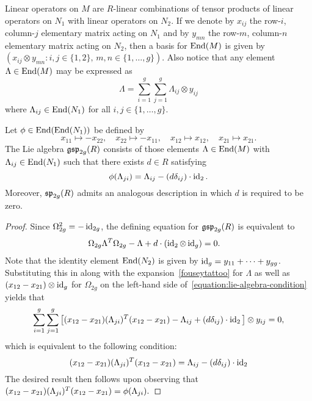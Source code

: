 Linear operators on $M$ are $R$-linear combinations of tensor products of linear operators on $N_1$ with linear operators on $N_2$. If we denote by $x_{ij}$ the row-$i$, column-$j$ elementary matrix acting on $N_1$ and by $y_{mn}$ the row-$m$, column-$n$ elementary matrix acting on $N_2$, then a basis for $\operatorname{End}(M)$ is given by $(x_{ij} \otimes y_{mn} : i,j \in \{1, 2\},\, m,n \in \{1, \dots, g\})$. Also notice that any element $\Lambda \in \operatorname{End}(M)$ may be expressed as
\begin{equation}\label{fouseytattoo}
\Lambda =  \sum_{i=1}^g \sum_{j=1}^g \Lambda_{ij} \otimes y_{ij}
\end{equation}
where $\Lambda_{ij} \in \operatorname{End}(N_1)$ for all $i,j \in \{1,\dots, g\}$.
\begin{proposition} \label{proposition:lie}
	Let $\phi \in \operatorname{End}(\operatorname{End}(N_1))$ be defined by
	\[
	x_{11} \mapsto -x_{22}, \quad x_{22} \mapsto -x_{11}, \quad x_{12} \mapsto x_{12}, \quad x_{21} \mapsto x_{21}.
	\]
The Lie algebra $\mathfrak{gsp}_{2g}(R)$ consists of those elements $\Lambda \in \operatorname{End}(M)$ with $\Lambda_{ij} \in \operatorname{End}(N_1)$ such that there exists $d \in R$ satisfying
    $$\phi(\Lambda_{ji}) = \Lambda_{ij} - (d\delta_{ij}) \cdot \operatorname{id}_2.$$
Moreover, $\mathfrak{sp}_{2g}(R)$ admits an analogous description in which $d$ is required to be zero. 
\end{proposition}
\begin{proof}  
Since $\Omega_{2g}^2 = -\operatorname{id}_{2g}$, the defining equation for $\mathfrak{gsp}_{2g}(R)$ is equivalent to
\begin{align}	
\Omega_{2g} \Lambda^T \Omega_{2g} - \Lambda + d \cdot (\operatorname{id}_2 \otimes \operatorname{id}_g) & = 0. \label{equation:lie-algebra-condition}
\end{align} 
Note that the identity element $\operatorname{End}(N_2)$ is given by $\operatorname{id}_g = y_{11} + \cdots + y_{gg}$. Substituting this in along with the expansion~\eqref{fouseytattoo} for $\Lambda$ as well as $(x_{12} - x_{21}) \otimes \operatorname{id}_g$ for $\Omega_{2g}$ on the left-hand side of~\eqref{equation:lie-algebra-condition} yields that
\[
\sum_{i =1}^g \sum_{j=1}^g \big[ (x_{12} - x_{21})(\Lambda_{ji})^T(x_{12} - x_{21}) - \Lambda_{ij} + (d\delta_{ij}) \cdot \operatorname{id}_2 \big] \otimes y_{ij} = 0,
\]
which is equivalent to the following condition:
\[
(x_{12} - x_{21})(\Lambda_{ji})^T(x_{12} - x_{21}) = \Lambda_{ij} - (d\delta_{ij}) \cdot \operatorname{id}_2
\]
The desired result then follows upon observing that 
	\(
	(x_{12} - x_{21})(\Lambda_{ji})^T(x_{12} - x_{21}) = \phi(\Lambda_{ji}). \qedhere
	\)
\end{proof} 

